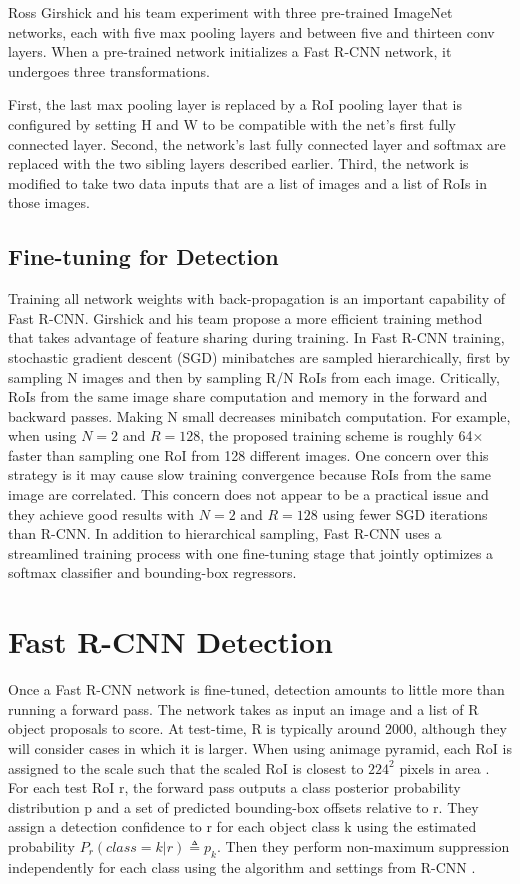 \documentclass[10pt,twocolumn,letterpaper]{article}
\begin{document}
Ross Girshick and his team experiment with three pre-trained ImageNet \cite{Deng2009ImageNet} networks, each with five max pooling layers and between five and thirteen conv layers. When a pre-trained network initializes a Fast R-CNN network, it undergoes three transformations.

First, the last max pooling layer is replaced by a RoI pooling layer that is configured by setting H and W to be compatible with the net's first fully connected layer. Second, the network's last fully connected layer and softmax are replaced with the two sibling layers described earlier. Third, the network is modified to take two data inputs that are a list of images and a list of RoIs in those images.

\subsection{Fine-tuning for Detection}

Training all network weights with back-propagation is an important capability of Fast R-CNN. Girshick and his team propose a more efficient training method that takes advantage of feature sharing during training. In Fast R-CNN training, stochastic gradient descent (SGD) minibatches are sampled hierarchically, first by sampling N images and then by sampling R/N RoIs from each image. Critically, RoIs from the same image share computation and memory in the forward and backward passes. Making N small decreases minibatch computation. For example, when using $N = 2$ and $R = 128$, the proposed training scheme is roughly 64$\times$ faster than sampling one RoI from 128 different images. One concern over this strategy is it may cause slow training convergence because RoIs from the same image are correlated. This concern does not appear to be a practical issue and they achieve good results with $N = 2$ and $R = 128$ using fewer SGD iterations than R-CNN. In addition to hierarchical sampling, Fast R-CNN uses a streamlined training process with one fine-tuning stage that jointly optimizes a softmax classifier and bounding-box regressors.

\section{Fast R-CNN Detection}

Once a Fast R-CNN network is fine-tuned, detection amounts to little more than running a forward pass. The network takes as input an image and a list of R object proposals to score. At test-time, R is typically around 2000, although they will consider cases in which it is larger. When using animage pyramid, each RoI is assigned to the scale such that the scaled RoI is closest to $224^2$ pixels in area \cite{He2014Spatial}. For each test RoI r, the forward pass outputs a class posterior probability distribution p and a set of predicted bounding-box offsets relative to r. They assign a detection confidence to r for each object class k using the estimated probability $P_r(class = k | r) \triangleq p_k$. Then they perform non-maximum suppression independently for each class using the algorithm and settings from R-CNN \cite{rich2104}.
\end{document}
